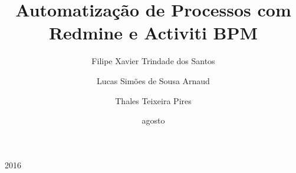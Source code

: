 \documentclass{projetofinal-dcc}
\begin{document}
\title{Automatização de Processos com Redmine e Activiti BPM}

\author{Filipe Xavier Trindade dos Santos }{}
\author{Lucas Simões de Sousa Arnaud }{}
\author{Thales Teixeira Pires}{}





\date{agosto}{2016} %
\maketitle

\startdocument

\maketocpage

\makethankspage

\begin{abstract}{
  
}
\end{abstract}

\begin{englishabstract}{
  
}
\end{englishabstract}

\makefigurespage
\end{document}
